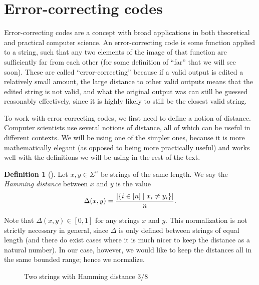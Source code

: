 \documentclass[english,12pt]{reedthesis}
\theoremstyle{plain}
\theoremstyle{definition}
\newtheorem{defn}[defn]{Definition}
\theoremstyle{remark}
\DeclarePairedDelimiter{\abs}{\lvert}{\rvert}
\begin{document}
\section{Error-correcting codes}

Error-correcting codes are a concept with broad applications in both theoretical
and practical computer science. An error-correcting code is some function
applied to a string, such that any two elements of the image of that function
are sufficiently far from each other (for some definition of ``far'' that we
will see soon). These are called ``error-correcting'' because if a valid output
is edited a relatively small amount, the large distance to other valid outputs
means that the edited string is not valid, and what the original output was can
still be guessed reasonably effectively, since it is highly likely to still be
the closest valid string.

To work with error-correcting codes, we first need to define a notion of
distance. Computer scientists use several notions of distance, all of which can
be useful in different contexts. We will be using one of the simpler ones,
because it is more mathematically elegant (as opposed to being more practically
useful) and works well with the definitions we will be using in the rest of the
text.

\begin{defn}[{\cite{Ham50}}]\label{def:hamming-dist}
  Let $x, y \in \Sigma^{n}$ be strings of the same length. We say the \emph{Hamming
    distance} between $x$ and $y$ is the value
  \[
    \Delta(x, y) = \frac{\abs{\{i \in [n] \mid x_{i} \ne y_{i}\}}}{n}.
  \]
\end{defn}

Note that $\Delta(x, y) \in [0, 1]$ for any strings $x$ and $y$. This normalization is
not strictly necessary in general, since $\Delta$ is only defined between strings of
equal length (and there do exist cases where it is much nicer to keep the
distance as a natural number). In our case, however, we would like to keep the
distances all in the same bounded range; hence we normalize.

\begin{figure}[htbp]
  \centering
  \caption{Two strings with Hamming distance $3/8$}\label{fig:hamming-dist}
\end{figure}
\end{document}
